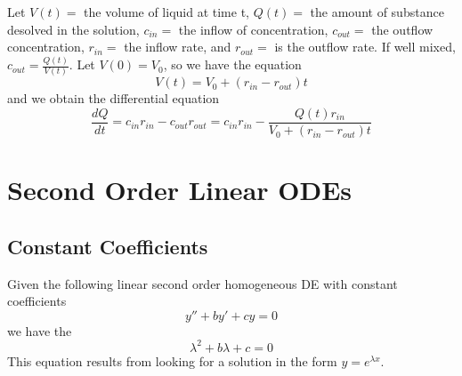 \documentclass[12pt, a4paper, oneside, openright, titlepage]{book}
\begin{document}
\begin{defn}
        Let $V(t) = $ the volume of liquid at time t, $Q(t) = $ the amount of substance desolved in the solution, $c_{in} = $ the inflow of concentration, $c_{out} = $ the outflow concentration, $r_{in} = $ the inflow rate, and $r_{out} = $ is the outflow rate. If well mixed, $c_{out} = \frac{Q(t)}{V(t)}$. Let $V(0) = V_0$, so we have the equation \begin{equation}
                V(t) = V_0 + (r_{in} - r_{out})t
        \end{equation}
        and we obtain the differential equation \begin{equation}
                \frac{dQ}{dt} = c_{in}r_{in} -c_{out}r_{out} = c_{in}r_{in} - \frac{Q(t)r_{in}}{V_0+(r_{in}-r_{out})t} 
        \end{equation}
\end{defn}









\clearpage

\chapter{Second Order Linear ODEs}

\section{Constant Coefficients}

\begin{defn}
        Given the following linear second order homogeneous DE with constant coefficients \begin{equation}
                y'' + by' + cy = 0 
        \end{equation}
        we have the  \begin{equation}
                \lambda^2 + b\lambda + c = 0
        \end{equation}
        This equation results from looking for a solution in the form $y = e^{\lambda x}$.
\end{defn}



\end{document}

